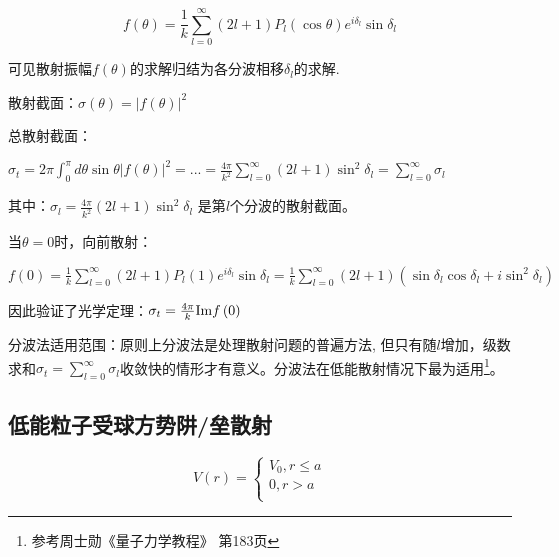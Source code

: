 \begin{equation}\label{26-12}
f\left( \theta  \right) = \frac{1}{k}\sum\limits_{l = 0}^\infty  {\left( {2l + 1} \right)P_l (\cos \theta )e^{i\delta _l } \sin \delta _l }
\end{equation}


可见散射振幅$f(\theta)$的求解归结为各分波相移$\delta_l$的求解.



散射截面：$\sigma \left( \theta  \right) = \left| {f\left( \theta  \right)} \right|^2 $



总散射截面：

$\sigma _t  = 2\pi \int_0^\pi  {d\theta \sin \theta \left| {f\left( \theta  \right)} \right|^2 }  = ... = \frac{{4\pi }}{{k^2 }}\sum\limits_{l = 0}^\infty  {\left( {2l + 1} \right)\sin ^2 \delta _l }  = \sum\limits_{l = 0}^\infty  {\sigma _l } $



其中：$\sigma _l  = \frac{{4\pi }}{{k^2 }}\left( {2l + 1} \right)\sin ^2 \delta _l $
是第$l$个分波的散射截面。



当$\theta = 0$时，向前散射：




$f\left( 0 \right) = \frac{1}{k}\sum\limits_{l = 0}^\infty  {\left( {2l + 1} \right)P_l (1)e^{i\delta _l } \sin \delta _l }  = \frac{1}{k}\sum\limits_{l = 0}^\infty  {\left( {2l + 1} \right)\left( {\sin \delta _l \cos \delta _l  + i\sin ^2 \delta _l } \right)}$


因此验证了光学定理：$\sigma _t  = \frac{{4\pi }}{k}{\mathop{\rm Im}\nolimits} f\left( 0 \right)$


分波法适用范围：原则上分波法是处理散射问题的普遍方法,
但只有随$l$增加，级数求和$\sigma _t  = \sum\limits_{l = 0}^\infty
{\sigma _l }
$收敛快的情形才有意义。分波法在低能散射情况下最为适用\footnote{参考周士勋《量子力学教程》
第183页}。


\subsection{低能粒子受球方势阱/垒散射}


\begin{equation}\label{26-13}
V(r) = \left\{ \begin{array}{l}
 V_0 ,r \le a \\
 0,r > a \\
 \end{array} \right.
\end{equation}


